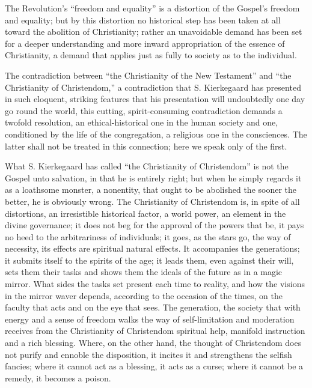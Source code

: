 \documentclass[12pt,a4paper,openany]{book}
\newcommand{\opage}[1]{\marginnote{\footnotesize\textit{[#1]}}}
\begin{document}
The Revolution's ``freedom and equality'' is a distortion
of the Gospel's freedom and equality; but by this
\setcounter{footnote}{0}%
\opage{311}distortion no historical step has been taken at all
toward the abolition of Christianity; rather an unavoidable
demand has been set for a deeper understanding and more inward
appropriation of the essence of Christianity, a demand
that applies just as fully to society as to the individual.

The contradiction between ``the Christianity of the New Testament''
and ``the Christianity of Christendom,'' a contradiction that
S. Kierkegaard has presented in such eloquent, striking
features that his presentation will undoubtedly one day go
round the world, this cutting, spirit-consuming contradiction
demands a twofold resolution, an ethical-historical one in
the human society and one, conditioned by the life of the congregation,
a religious one in the consciences. The latter shall
not be treated in this connection; here we speak only
of the first.

What S. Kierkegaard has called ``the Christianity of Christendom''
is not the Gospel unto salvation, in that he is entirely
right; but when he simply regards it
as a loathsome monster, a nonentity, that ought to be abolished
the sooner the better, he is obviously wrong. The Christianity of Christendom
is, in spite of all distortions, an irresistible
historical factor, a world power, an element in the divine
governance; it does not beg for the approval of the powers that be,
it pays no heed to the arbitrariness of individuals; it
goes, as the stars go, the way of necessity, its
effects are spiritual natural effects. It accompanies
the generations; it submits itself to the spirits of the age; it
leads them, even against their will, sets them their tasks
and shows them the ideals of the future as in a magic
mirror. What sides the tasks set present each time
to reality, and how the visions in the mirror
\setcounter{footnote}{0}%
\opage{312}waver depends, according to the occasion of the times, on the faculty that
acts and on the eye that sees. The generation, the society
that with energy and a sense of freedom walks the way of self-limitation
and moderation receives from the Christianity of Christendom
spiritual help, manifold instruction
and a rich blessing. Where, on the other hand, the thought of Christendom
does not purify and ennoble the disposition, it incites it and strengthens
the selfish fancies; where it cannot
act as a blessing, it acts as a curse;
where it cannot be a remedy, it becomes
a poison.
\end{document}
